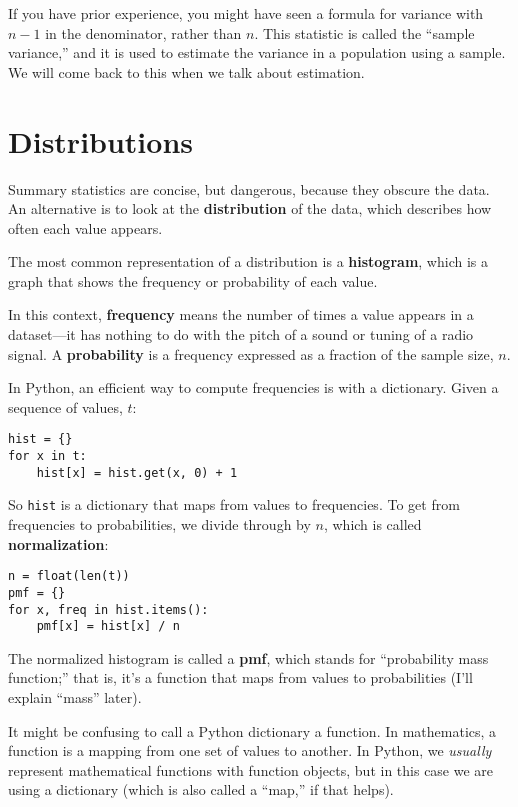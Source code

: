 \documentclass[10pt]{book}
\begin{document}
If you have prior experience, you might have seen a 
formula for variance with $n-1$ in the denominator, rather than $n$.
This statistic is called the ``sample variance,'' and it is used
to estimate the variance in a population using a sample.  We will
come back to this when we talk about estimation.

\section{Distributions}

Summary statistics are concise, but dangerous, because they obscure
the data.  An alternative is to look at the {\bf distribution} of the
data, which describes how often each value appears.

The most common representation of a distribution is a {\bf histogram},
which is a graph that shows the frequency or probability
of each value.  

In this context, {\bf frequency} means the number of times a value
appears in a dataset---it has nothing to do with the pitch of a sound
or tuning of a radio signal.  A {\bf probability} is a frequency expressed
as a fraction of the sample size, $n$.

In Python, an efficient way to compute frequencies is with a dictionary.
Given a sequence of values, $t$:

\begin{verbatim}
hist = {}
for x in t:
    hist[x] = hist.get(x, 0) + 1
\end{verbatim}

So {\tt hist} is a dictionary that maps from values to frequencies.
To get from frequencies to probabilities, we divide through by $n$,
which is called {\bf normalization}:

\begin{verbatim}
n = float(len(t))
pmf = {}
for x, freq in hist.items():
    pmf[x] = hist[x] / n
\end{verbatim}

The normalized histogram is called a {\bf pmf}, which stands for
``probability mass function;''  that is, it's a function that
maps from values to probabilities (I'll explain ``mass'' later).

It might be confusing to call a Python dictionary a function.  In
mathematics, a function is a mapping from one set of values to
another.  In Python, we {\em usually} represent mathematical functions
with function objects, but in this case we are using a dictionary
(which is also called a ``map,'' if that helps).
\end{document}
